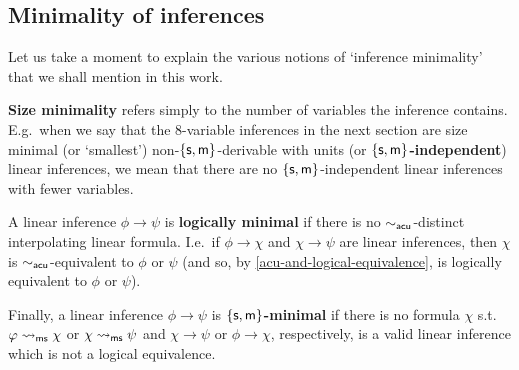 \documentclass[a4paper, UKenglish, cleveref]{lipics-v2019}
\begin{document}

\subsection{Minimality of inferences}
Let us take a moment to explain the various notions of `inference minimality' that we shall mention in this work.


\textbf{Size minimality} refers simply to the number of variables the inference contains. E.g.\ when we say that the \(8\)-variable inferences in the next section are size minimal (or `smallest') non-\(\{\mathsf{s},\mathsf{m}\}\)-derivable with units (or \textbf{$\{\mathsf{s},\mathsf{m} \}$-independent}) linear inferences, we mean that there are no \(\{\mathsf{s},\mathsf{m}\}\)-independent linear inferences with fewer variables.

A linear inference \(\phi \to \psi\) is \textbf{logically minimal} if there is no $\sim_{\mathsf{acu}}$-distinct interpolating linear formula.
  I.e.\ if \(\phi \to \chi\) and \(\chi \to \psi\) are linear inferences, then $\chi$ is $\sim_{\mathsf{acu}}$-equivalent to $\phi$ or $\psi$ (and so, by \cref{acu-and-logical-equivalence}, is logically equivalent to \(\phi\) or \(\psi\)).


  Finally, a linear inference \(\phi \to \psi\) is \textbf{\(\{\mathsf{s},\mathsf{m}\}\)-minimal} if there is no formula $\chi$ s.t.\ \(\varphi \rightsquigarrow_{\mathsf{ms}} \chi\) or \(\chi \rightsquigarrow_{\mathsf{ms}} \psi\) and $\chi \to \psi$ or $\phi \to \chi$, respectively, is a valid linear inference which is not a logical equivalence.
\end{document}

